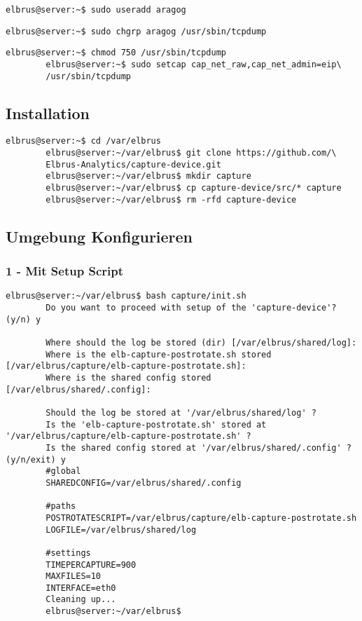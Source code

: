\documentclass{article}
\begin{document}
	\begin{lstlisting}[caption={Anlegen eines Users der Berechtigungen zum ausführen von 'tcpdump' erhält.}]
		elbrus@server:~$ sudo useradd aragog
	\end{lstlisting}
	
	\begin{lstlisting}[caption={Zuweisen von 'tcpdump' zu der Gruppe 'aragog'.}]
		elbrus@server:~$ sudo chgrp aragog /usr/sbin/tcpdump
	\end{lstlisting}
	
	\begin{lstlisting}[caption={Ändern der Berechtigungen auf 'tcpdump'.}]
		elbrus@server:~$ chmod 750 /usr/sbin/tcpdump
		elbrus@server:~$ sudo setcap cap_net_raw,cap_net_admin=eip\
		/usr/sbin/tcpdump
	\end{lstlisting}
	
	\subsection{Installation}
	\begin{lstlisting}[caption={Clonen der Software von GitHub.}]
		elbrus@server:~$ cd /var/elbrus
		elbrus@server:~/var/elbrus$ git clone https://github.com/\
		Elbrus-Analytics/capture-device.git
		elbrus@server:~/var/elbrus$ mkdir capture
		elbrus@server:~/var/elbrus$ cp capture-device/src/* capture
		elbrus@server:~/var/elbrus$ rm -rfd capture-device
	\end{lstlisting}
	
	\newpage
	\subsection[file config]{Umgebung Konfigurieren}
	\subsubsection{1 - Mit Setup Script}
	\begin{lstlisting}[caption={Ausführen des setup Scripts}, breaklines=true,]
		elbrus@server:~/var/elbrus$ bash capture/init.sh
		Do you want to proceed with setup of the 'capture-device'? (y/n) y
		
		Where should the log be stored (dir) [/var/elbrus/shared/log]:
		Where is the elb-capture-postrotate.sh stored [/var/elbrus/capture/elb-capture-postrotate.sh]:
		Where is the shared config stored [/var/elbrus/shared/.config]:
		
		Should the log be stored at '/var/elbrus/shared/log' ?
		Is the 'elb-capture-postrotate.sh' stored at '/var/elbrus/capture/elb-capture-postrotate.sh' ?
		Is the shared config stored at '/var/elbrus/shared/.config' ? (y/n/exit) y
		#global
		SHAREDCONFIG=/var/elbrus/shared/.config
		
		#paths
		POSTROTATESCRIPT=/var/elbrus/capture/elb-capture-postrotate.sh
		LOGFILE=/var/elbrus/shared/log
		
		#settings
		TIMEPERCAPTURE=900
		MAXFILES=10
		INTERFACE=eth0
		Cleaning up...
		elbrus@server:~/var/elbrus$
	\end{lstlisting}
	
\end{document}
